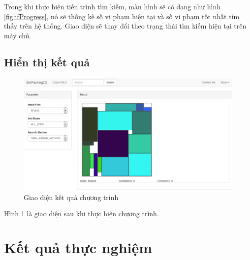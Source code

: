 Trong khi thực hiện tiến trình tìm kiếm, màn hình sẽ có dạng như hình \ref{fig:ifProgress}, nó sẽ thống kê số vi phạm hiện tại và số vi phạm tốt nhất tìm thấy trên hệ thống. Giao diện sẽ thay đổi theo trạng thái tìm kiếm hiện tại trên máy chủ.

\subsection*{Hiển thị kết quả}
\begin{figure}
	\centering
	\includegraphics[scale=0.5]{figures/if-result.png}
	\caption{Giao diện kết quả chương trình \label{fig:ifResult}}
\end{figure}
Hình \ref{fig:ifResult} là giao diện sau khi thực hiện chương trình.
\section{Kết quả thực nghiệm}
